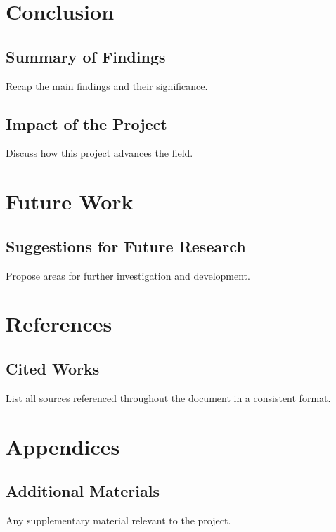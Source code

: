\documentclass[12pt]{article}
\begin{document}
\section{Conclusion}
\subsection{Summary of Findings}
Recap the main findings and their significance.
\subsection{Impact of the Project}
Discuss how this project advances the field.

\section{Future Work}
\subsection{Suggestions for Future Research}
Propose areas for further investigation and development.

\section{References}
\subsection{Cited Works}
List all sources referenced throughout the document in a consistent format.

\section{Appendices}
\subsection{Additional Materials}
Any supplementary material relevant to the project.
\end{document}
